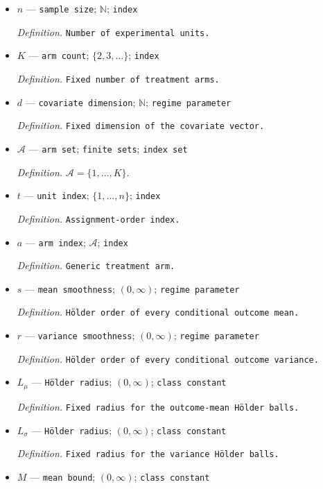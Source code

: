 \documentclass{article}
\begin{document}
\begin{itemize}
  \item \(n\) --- \texttt{sample size}; \(\mathbb N\); \texttt{index}
  \par\smallskip\noindent\emph{Definition.} \texttt{Number of experimental units.}
  \item \(K\) --- \texttt{arm count}; \(\{2,3,\ldots\}\); \texttt{index}
  \par\smallskip\noindent\emph{Definition.} \texttt{Fixed number of treatment arms.}
  \item \(d\) --- \texttt{covariate dimension}; \(\mathbb N\); \texttt{regime parameter}
  \par\smallskip\noindent\emph{Definition.} \texttt{Fixed dimension of the covariate vector.}
  \item \(\mathcal A\) --- \texttt{arm set}; \texttt{finite sets}; \texttt{index set}
  \par\smallskip\noindent\emph{Definition.} \(\mathcal A=\{1,\ldots,K\}\).
  \item \(t\) --- \texttt{unit index}; \(\{1,\ldots,n\}\); \texttt{index}
  \par\smallskip\noindent\emph{Definition.} \texttt{Assignment-\allowbreak{}order index.}
  \item \(a\) --- \texttt{arm index}; \(\mathcal A\); \texttt{index}
  \par\smallskip\noindent\emph{Definition.} \texttt{Generic treatment arm.}
  \item \(s\) --- \texttt{mean smoothness}; \((0,\infty)\); \texttt{regime parameter}
  \par\smallskip\noindent\emph{Definition.} \texttt{Hölder order of every conditional outcome mean.}
  \item \(r\) --- \texttt{variance smoothness}; \((0,\infty)\); \texttt{regime parameter}
  \par\smallskip\noindent\emph{Definition.} \texttt{Hölder order of every conditional outcome variance.}
  \item \(L_{\mu}\) --- \texttt{Hölder radius}; \((0,\infty)\); \texttt{class constant}
  \par\smallskip\noindent\emph{Definition.} \texttt{Fixed radius for the outcome-\allowbreak{}mean Hölder balls.}
  \item \(L_{\sigma}\) --- \texttt{Hölder radius}; \((0,\infty)\); \texttt{class constant}
  \par\smallskip\noindent\emph{Definition.} \texttt{Fixed radius for the variance Hölder balls.}
  \item \(M\) --- \texttt{mean bound}; \((0,\infty)\); \texttt{class constant}

\end{itemize}
\end{document}
